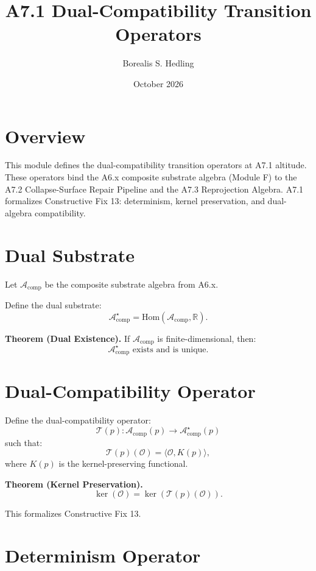 \documentclass[11pt]{article}
\title{A7.1 Dual-Compatibility Transition Operators}
\author{Borealis S. Hedling}
\date{October 2026}
\begin{document}
\maketitle

\section*{Overview}

This module defines the dual-compatibility transition operators at A7.1
altitude. These operators bind the A6.x composite substrate algebra (Module F)
to the A7.2 Collapse-Surface Repair Pipeline and the A7.3 Reprojection Algebra.
A7.1 formalizes Constructive Fix 13: determinism, kernel preservation, and
dual-algebra compatibility.

\section{Dual Substrate}

Let $\mathcal{A}_{\mathrm{comp}}$ be the composite substrate algebra from A6.x.

Define the dual substrate:
\[
\mathcal{A}^\star_{\mathrm{comp}} =
\mathrm{Hom}(\mathcal{A}_{\mathrm{comp}}, \mathbb{R}).
\]

\textbf{Theorem (Dual Existence).}
If $\mathcal{A}_{\mathrm{comp}}$ is finite-dimensional, then:
\[
\mathcal{A}^\star_{\mathrm{comp}} \text{ exists and is unique}.
\]

\section{Dual-Compatibility Operator}

Define the dual-compatibility operator:
\[
\mathcal{T}(p) :
\mathcal{A}_{\mathrm{comp}}(p)
\to
\mathcal{A}^\star_{\mathrm{comp}}(p)
\]
such that:
\[
\mathcal{T}(p)(\mathcal{O}) = \langle \mathcal{O}, K(p) \rangle,
\]
where $K(p)$ is the kernel-preserving functional.

\textbf{Theorem (Kernel Preservation).}
\[
\ker(\mathcal{O}) = \ker(\mathcal{T}(p)(\mathcal{O})).
\]

This formalizes Constructive Fix 13.

\section{Determinism Operator}
\end{document}
